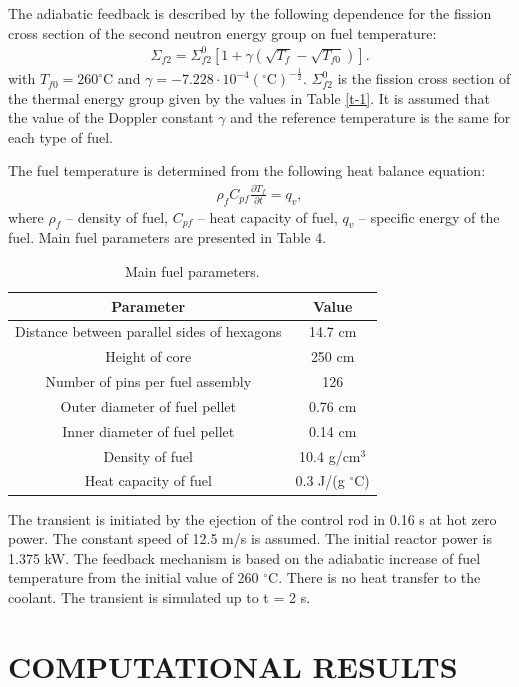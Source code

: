 \documentclass{aip-cp}
\begin{document}
The adiabatic feedback is described by the following dependence for the fission cross section
of the second neutron energy group on fuel temperature:
\begin{eqnarray*}
\Sigma_{f2} = \Sigma_{f2}^0 \left[ 1 + \gamma (\sqrt{T_f} - \sqrt{T_{f0}})\right].
\end{eqnarray*}
with $T_{f0}=260^{\circ}\mathrm{C}$ and $\gamma=-7.228\cdot 10^{-4}(^{\circ}\mathrm{C})^{-\frac{1}{2}}$. $\Sigma_{f2}^0$ is the fission cross section of the thermal energy group given by the values in Table \ref{t-1}.
It is assumed that the value of the Doppler constant $\gamma$ and the reference temperature is the same for each type of fuel.

The fuel temperature is determined from the following heat balance equation:
\begin{eqnarray*}
\rho_f C_{pf} \frac{\partial T_f}{\partial t} = q_v,
\end{eqnarray*}
where $\rho_f$ -- density of fuel, $C_{pf}$ -- heat capacity of fuel, $q_v$ -- specific energy of the fuel.
Main fuel parameters are presented in Table 4.

\begin{table}[!h]
\caption{Main fuel parameters.}
\label{t-4}
\begin{tabular}{cc}
\hline
Parameter&Value\\
\hline
Distance between parallel sides of hexagons& 14.7 cm\\
Height of core&250 cm\\
Number of pins per fuel assembly& 126\\
Outer diameter of fuel pellet& 0.76 cm\\
Inner diameter of fuel pellet& 0.14 cm\\
Density of fuel& 10.4 g/cm$^3$\\
Heat capacity of fuel& 0.3 J/(g $^{\circ}\mathrm{C}$)\\
\hline
\end{tabular}
\end{table}

The transient is initiated by the ejection of the control rod in 0.16 s at hot zero power. The constant speed of 12.5 m/s is assumed. The initial reactor power is 1.375 kW. 
The feedback mechanism is based on the adiabatic increase of fuel temperature from the initial value of 260 $^{\circ}$C. There is no heat transfer to the coolant. The transient is simulated up to t = 2 s.

\section{COMPUTATIONAL RESULTS}
\end{document}
